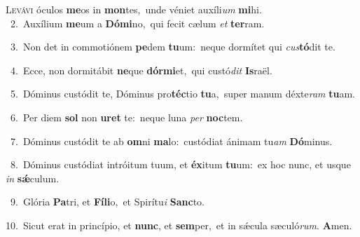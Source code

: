 \lettrine{\initial\textcolor{\initialcolor}{L}}{evávi} óculos \textbf{me}\-os in \textbf{mon}\-tes,~\star unde véniet auxíli\textit{um} \textbf{mi}\-hi.\\
{\numbfont\textcolor{\numbcolor}{~2.}}~Auxílium \textbf{me}\-um a \textbf{Dó}\-\textbf{mi}no,~\star qui fecit cælum \textit{et} \textbf{ter}\-ram.\par
{\numbfont\textcolor{\numbcolor}{~3.}}~Non det in commotiónem \textbf{pe}\-dem \textbf{tu}\-um:~\star neque dormítet qui \textit{cus}\-\textbf{tó}dit te.\par
{\numbfont\textcolor{\numbcolor}{~4.}}~Ecce, non dormitábit \textbf{ne}\-que \textbf{dór}\-\textbf{mi}et,~\star qui custó\textit{dit} \textbf{Is}\-raël.\par
{\numbfont\textcolor{\numbcolor}{~5.}}~Dóminus custódit te, Dóminus pro\-\textbf{téc}\-tio \textbf{tu}\-a,~\star super manum déxte\textit{ram} \textbf{tu}\-am.\par
{\numbfont\textcolor{\numbcolor}{~6.}}~Per diem \textbf{sol} non \textbf{u}\-\textbf{ret} te:~\star neque luna \textit{per} \textbf{noc}\-tem.\par
{\numbfont\textcolor{\numbcolor}{~7.}}~Dóminus custódit te ab \textbf{om}\-ni \textbf{ma}\-lo:~\star custódiat ánimam tu\textit{am} \textbf{Dó}\-minus.\par
{\numbfont\textcolor{\numbcolor}{~8.}}~Dóminus custódiat intróitum tuum, et \textbf{éx}\-itum \textbf{tu}\-um:~\star ex hoc nunc, et usque \textit{in} \textbf{sǽ}\-culum.\par
{\numbfont\textcolor{\numbcolor}{~9.}}~Glória \textbf{Pa}\-tri, et \textbf{Fí}\-\textbf{li}o,~\star et Spirítu\textit{i} \textbf{Sanc}\-to.\par
{\numbfont\textcolor{\numbcolor}{10.}}~Sicut erat in princípio, et \textbf{nunc}\-, et \textbf{sem}\-per,~\star et in sǽcula sæculó\-\textit{rum}\-. \textbf{A}\-men.\par
